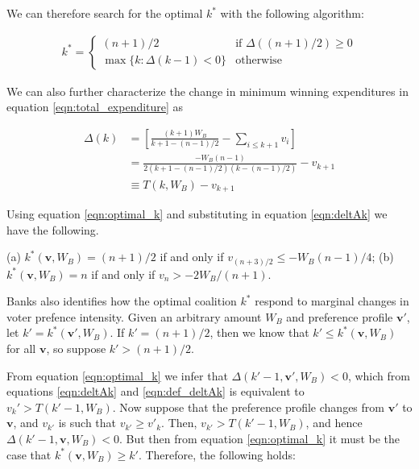 We can therefore search for the optimal $k^*$ with the following algorithm:

\begin{align}
    \label{eqn:optimal_k}
    k^* = 
    \begin{cases}
        (n + 1)/2 & \text{if } \Delta((n + 1)/2) \geq 0 \\
        \max\{k : \Delta(k - 1) < 0\} & \text{otherwise}
    \end{cases}
\end{align}

We can also further characterize the change in minimum winning expenditures in equation \ref{eqn:total_expenditure} as

\begin{align}
    \Delta(k)  & = \left[\frac{(k + 1)W_B}{k + 1 - (n - 1)/2} - \sum_{i \leq k + 1}v_i \right]\\
    \label{eqn:deltAk}
    & = \frac{-W_B (n - 1)}{2(k + 1 - (n - 1)/2)(k - (n - 1)/2)} - v_{k + 1}\\
    \label{eqn:def_deltAk}
    & \equiv T(k, W_B) - v_{k + 1}
\end{align}

Using equation \ref{eqn:optimal_k} and substituting in equation \ref{eqn:deltAk} we have the following.

\begin{proposition}
    (a) $k^*(\mathbf{v}, W_B) = (n + 1)/2$ if and only if $v_{(n + 3)/2} \leq -W_B(n - 1)/4$; (b) $k^*(\mathbf{v}, W_B) = n$ if and only if $v_n > -2W_B/(n + 1)$.
\end{proposition}

Banks also identifies how the optimal coalition $k^*$ respond to marginal changes in voter prefence intensity. Given an arbitrary amount $W_B$ and preference profile $\mathbf{v}'$, let $k' = k^*(\mathbf{v'}, W_B)$. If $k' = (n + 1)/2$, then we know that $k' \leq k^*(\mathbf{v}, W_B)$ for all $\mathbf{v}$, so suppose $k' > (n + 1)/2$.

From equation \ref{eqn:optimal_k} we infer that $\Delta(k' - 1, \mathbf{v}', W_B) < 0$, which from equations \ref{eqn:deltAk} and \ref{eqn:def_deltAk} is equivalent to $v_k' > T(k' - 1, W_B)$. Now suppose that the preference profile changes from $\mathbf{v}'$ to $\mathbf{v}$, and $v_{k'}$ is such that $v_{k'} \geq v'_k$. Then, $v_{k'} > T(k' - 1, W_B)$, and hence $\Delta(k' - 1, \mathbf{v}, W_B) < 0$. But then from equation \ref{eqn:optimal_k} it must be the case that $k^*(\mathbf{v}, W_B) \geq k'$. Therefore, the following holds:

